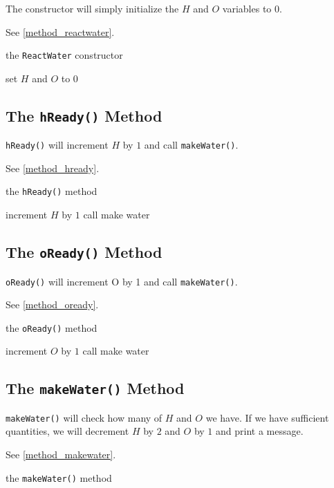 \documentclass[12pt, letterpaper]{report}
\newcommand{\code}[1]{\texttt{#1}}
\begin{document}
The constructor will simply initialize the $H$ and $O$ variables to $0$.

See \vref{method_reactwater}.

\begin{algorithm}[!ht]
  \caption{the \code{ReactWater} constructor}
  \label{method_reactwater}
    \SetAlgoLined
    set $H$ and $O$ to $0$\;
\end{algorithm}

\subsection*{The \code{hReady()} Method}

\code{hReady()} will increment $H$ by $1$ and call \code{makeWater()}.

See \vref{method_hready}.

\begin{algorithm}[!ht]
  \caption{the \code{hReady()} method}
  \label{method_hready}
    \SetAlgoLined
    increment $H$ by $1$\;
    call make water\;
\end{algorithm}

\subsection*{The \code{oReady()} Method}

\code{oReady()} will increment O by 1 and call \code{makeWater()}.

See \vref{method_oready}.

\begin{algorithm}[!ht]
  \caption{the \code{oReady()} method}
  \label{method_oready}
    \SetAlgoLined
     increment $O$ by $1$\;
     call make water\;
\end{algorithm}

\subsection*{The \code{makeWater()} Method}

\code{makeWater()} will check how many of $H$ and $O$ we have. If we have sufficient quantities, we will decrement $H$ by $2$ and $O$ by $1$ and print a message.

See \vref{method_makewater}.

\begin{algorithm}[!ht]
  \caption{the \code{makeWater()} method}
  \label{method_makewater}
    \SetAlgoLined
\end{algorithm}
\end{document}

